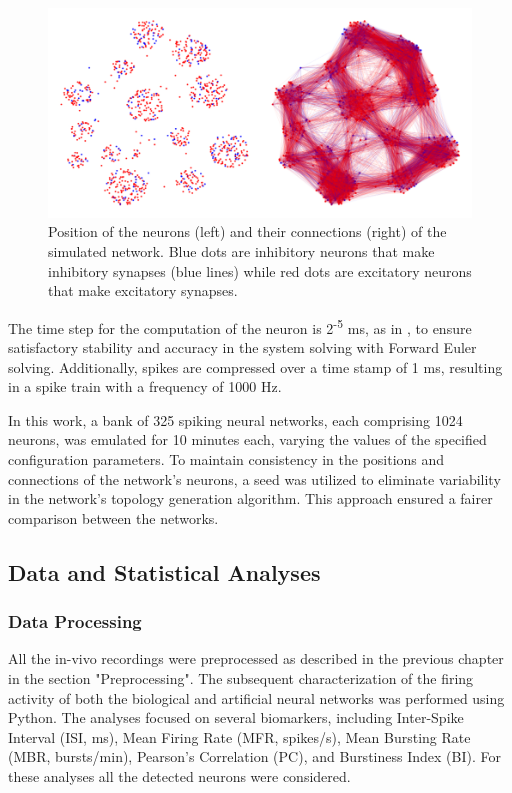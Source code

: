 \begin{figure}[ht!]
    \begin{center}
    \includegraphics[width=0.9\linewidth]{Figure/Network Topology.jpg}
    \end{center}
    \caption{Position of the neurons (left) and their connections (right) of the simulated network. Blue dots are inhibitory neurons that make inhibitory synapses (blue lines) while red dots are excitatory neurons that make excitatory synapses.}
    \label{fig:Network Topology}
\end{figure}

The time step for the computation of the neuron is 2\textsuperscript{-5} ms, as in \cite{Khoyratee2019}, to ensure satisfactory stability and accuracy in the system solving with Forward Euler solving. Additionally, spikes are compressed over a time stamp of 1 ms, resulting in a spike train with a frequency of 1000 Hz.

In this work, a bank of 325 spiking neural networks, each comprising 1024 neurons, was emulated for 10 minutes each, varying the values of the specified configuration parameters. To maintain consistency in the positions and connections of the network's neurons, a seed was utilized to eliminate variability in the network's topology generation algorithm. This approach ensured a fairer comparison between the networks.

\subsection{Data and Statistical Analyses}

\subsubsection{Data Processing}

All the in-vivo recordings were preprocessed as described in the previous chapter in the section "Preprocessing". The subsequent characterization of the firing activity of both the biological and artificial neural networks was performed using Python. The analyses focused on several biomarkers, including Inter-Spike Interval (ISI, ms), Mean Firing Rate (MFR, spikes/s), Mean Bursting Rate (MBR, bursts/min), Pearson’s Correlation (PC), and Burstiness Index (BI). For these analyses all the detected neurons were considered.


